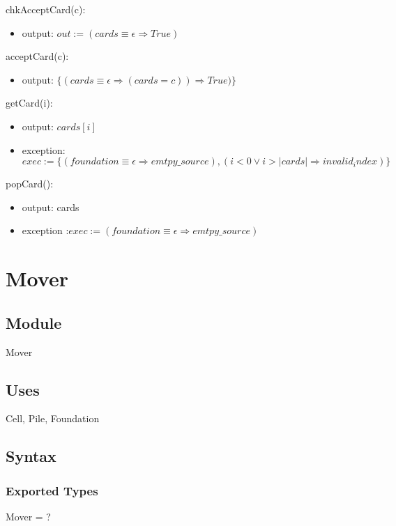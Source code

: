 \documentclass[12pt,fleqn]{article}
\begin{document}
\noindent chkAcceptCard(c):
\begin{itemize}
\item output: $out := (cards \equiv \epsilon \Rightarrow True)$  
\end{itemize}

\noindent acceptCard(c):
\begin{itemize}
\item output: $\{(cards \equiv \epsilon \Rightarrow (cards = c))\Rightarrow True)\}$
\end{itemize}

\noindent getCard(i):
\begin{itemize}
\item output: $cards[i]$
\item exception:$exec := \{(foundation \equiv \epsilon \Rightarrow emtpy\_source),(i < 0 \lor i > |cards| \Rightarrow invalid_index)\} $
\end{itemize}

\noindent popCard():
\begin{itemize}
\item output: cards
\item exception :$exec := (foundation \equiv \epsilon \Rightarrow emtpy\_source)$
\end{itemize}



\section* {Mover}

\subsection* {Module}

Mover

\subsection* {Uses}

Cell, Pile, Foundation

\subsection* {Syntax}

\subsubsection* {Exported Types}
Mover = ?
\end{document}

